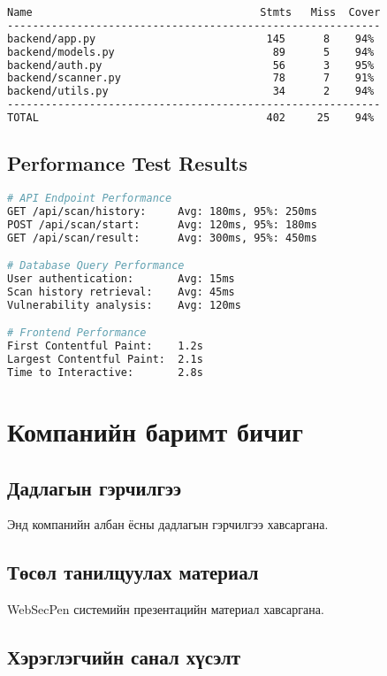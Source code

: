 \documentclass[main.tex]{subfiles}
\begin{document}
\begin{lstlisting}[language=bash, caption=Кодын хамрах хувийн тайлан]
Name                                    Stmts   Miss  Cover
-----------------------------------------------------------
backend/app.py                           145      8    94%
backend/models.py                         89      5    94%
backend/auth.py                           56      3    95%
backend/scanner.py                        78      7    91%
backend/utils.py                          34      2    94%
-----------------------------------------------------------
TOTAL                                    402     25    94%
\end{lstlisting}

\section{Performance Test Results}

\begin{lstlisting}[language=bash, caption=API гүйцэтгэлийн тест]
# API Endpoint Performance
GET /api/scan/history:     Avg: 180ms, 95%: 250ms
POST /api/scan/start:      Avg: 120ms, 95%: 180ms
GET /api/scan/result:      Avg: 300ms, 95%: 450ms

# Database Query Performance  
User authentication:       Avg: 15ms
Scan history retrieval:    Avg: 45ms
Vulnerability analysis:    Avg: 120ms

# Frontend Performance
First Contentful Paint:    1.2s
Largest Contentful Paint:  2.1s
Time to Interactive:       2.8s
\end{lstlisting}

\chapter{Компанийн баримт бичиг}

\section{Дадлагын гэрчилгээ}

Энд компанийн албан ёсны дадлагын гэрчилгээ хавсаргана.

\section{Төсөл танилцуулах материал}

WebSecPen системийн презентацийн материал хавсаргана.

\section{Хэрэглэгчийн санал хүсэлт}
\end{document}
